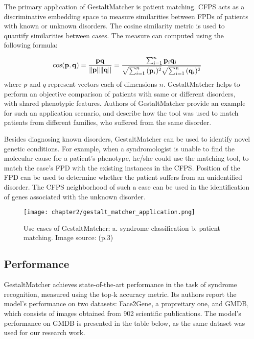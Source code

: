\documentclass[../report.tex]{subfiles}
\begin{document}
    
    The primary application of GestaltMatcher is patient matching. CFPS acts as a discriminative embedding space to measure similarities between FPDs of patients with known or unknown disorders. The cosine similarity metric is used to quantify similarities between cases. The measure can computed using the following formula: 
 
    \begin{equation}
    	\cos ({\bf p},{\bf q})= {{\bf p} {\bf q} \over \|{\bf p}\| \|{\bf q}\|} = \frac{ \sum_{i=1}^{n}{{\bf p}_i{\bf q}_i} }{ \sqrt{\sum_{i=1}^{n}{({\bf p}_i)^2}} \sqrt{\sum_{i=1}^{n}{({\bf q}_i)^2}} }
    \end{equation}
	where $p$ and $q$ represent vectors each of dimensions $n$.
    GestaltMatcher helps to perform an objective comparison of patients with same or different disorders, with shared phenotypic features. Authors of GestaltMatcher provide an example for such an application scenario, and describe how the tool was used to match patients from different families, who suffered from the same disorder. 
    
    Besides diagnosing known disorders, GestaltMatcher can be used to identify novel genetic conditions. For example, when a syndromologist is unable to find the molecular cause for a patient's phenotype, he/she could use the matching tool, to match the case's FPD with the existing instances in the CFPS. Position of the FPD can be used to determine whether the patient suffers from an unidentified disorder. The CFPS neighborhood of such a case can be used in the identification of genes associated with the unknown disorder. 
    \begin{figure}[ht]
    	\hspace*{1.0cm}      
    	\texttt{[image: chapter2/gestalt\_matcher\_application.png]}
    	\caption{Use cases of GestaltMatcher: a. syndrome classification b. patient matching. Image source: \cite{hsieh2022gestaltmatcher} (p.3) }
    	\label{fig_app_gest_matcher_chap2}
    \end{figure}
    \subsection{Performance}
    GestaltMatcher achieves state-of-the-art performance in the task of syndrome recognition, measured using the top-k accuracy metric. Its authors report the model's performance on two datasets: Face2Gene, a propreitary one, and GMDB, which consists of images obtained from 902 scientific publications. The model's performance on GMDB is presented in the table below, as the same dataset was used for our research work.  
\end{document}

